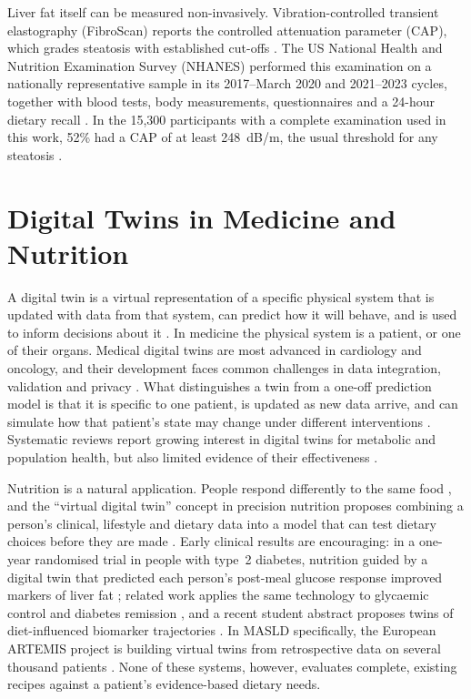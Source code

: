 Liver fat itself can be measured non-invasively. Vibration-controlled
transient elastography (FibroScan) reports the controlled attenuation
parameter (CAP), which grades steatosis with established cut-offs
\cite{karlas2017cap,ferraioli2021cap}. The US National Health and Nutrition
Examination Survey (NHANES) performed this examination on a nationally
representative sample in its 2017--March 2020 and 2021--2023 cycles, together
with blood tests, body measurements, questionnaires and a 24-hour dietary
recall \cite{nhanes_lux}. In the 15{,}300 participants with a complete
examination used in this work, 52\% had a CAP of at least 248~dB/m, the usual
threshold for any steatosis \cite{karlas2017cap}.

\section{Digital Twins in Medicine and Nutrition}
\label{sec:digital_twins}
A digital twin is a virtual representation of a specific physical system that
is updated with data from that system, can predict how it will behave, and is
used to inform decisions about it \cite{nasem2024digitaltwins}. In medicine
the physical system is a patient, or one of their organs. Medical digital
twins are most advanced in cardiology and oncology, and their development
faces common challenges in data integration, validation and privacy
\cite{laubenbacher2024medicine,katsoulakis2024digital}. What distinguishes a
twin from a one-off prediction model is that it is specific to one patient, is
updated as new data arrive, and can simulate how that patient's state may
change under different interventions
\cite{nasem2024digitaltwins,katsoulakis2024digital}. Systematic reviews report
growing interest in digital twins for metabolic and population health, but
also limited evidence of their effectiveness
\cite{su2025metabolic,shen2024effectiveness}.

Nutrition is a natural application. People respond differently to the same
food \cite{zeevi2015personalized}, and the ``virtual digital twin'' concept in
precision nutrition proposes combining a person's clinical, lifestyle and
dietary data into a model that can test dietary choices before they are made
\cite{gkouskou2020virtual}. Early clinical results are encouraging: in a
one-year randomised trial in people with type~2 diabetes, nutrition guided by
a digital twin that predicted each person's post-meal glucose response
improved markers of liver fat \cite{joshi2023digitaltwin}; related work applies
the same technology to glycaemic control and diabetes remission
\cite{twinhealth2024frontiers}, and a recent student abstract proposes twins
of diet-influenced biomarker trajectories \cite{nobel2026idtdiet}. In MASLD
specifically, the European ARTEMIS project is building virtual twins from
retrospective data on several thousand patients \cite{artemis2024}. None of
these systems, however, evaluates complete, existing recipes against a
patient's evidence-based dietary needs.

